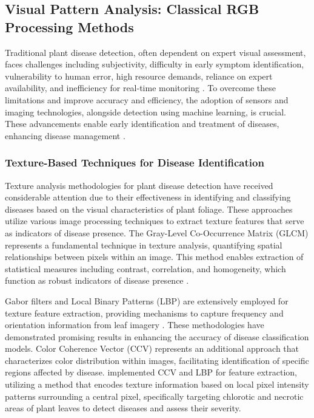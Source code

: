 \documentclass[sn-mathphys]{sn-jnl}
\theoremstyle{thmstyleone}%
\theoremstyle{thmstyletwo}%
\theoremstyle{thmstylethree}%
\begin{document}
\subsection{Visual Pattern Analysis: Classical RGB Processing Methods}
Traditional plant disease detection, often dependent on expert visual assessment, faces challenges including subjectivity, difficulty in early symptom identification, vulnerability to human error, high resource demands, reliance on expert availability, and inefficiency for real-time monitoring \citep{wang2017automatic, sankaran2010review}. To overcome these limitations and improve accuracy and efficiency, the adoption of sensors and imaging technologies, alongside detection using machine learning, is crucial. These advancements enable early identification and treatment of diseases, enhancing disease management \citep{gavhale2014overview}. 


\subsubsection{Texture-Based Techniques for Disease Identification}

Texture analysis methodologies for plant disease detection have received considerable attention due to their effectiveness in identifying and classifying diseases based on the visual characteristics of plant foliage. These approaches utilize various image processing techniques to extract texture features that serve as indicators of disease presence. The Gray-Level Co-Occurrence Matrix (GLCM) represents a fundamental technique in texture analysis, quantifying spatial relationships between pixels within an image. This method enables extraction of statistical measures including contrast, correlation, and homogeneity, which function as robust indicators of disease presence \citep{waldchen2018plant}.

Gabor filters and Local Binary Patterns (LBP) are extensively employed for texture feature extraction, providing mechanisms to capture frequency and orientation information from leaf imagery \citep{waldchen2018plant, naresh2016classification}. These methodologies have demonstrated promising results in enhancing the accuracy of disease classification models. Color Coherence Vector (CCV) represents an additional approach that characterizes color distribution within images, facilitating identification of specific regions affected by disease. \citet{abdu2020automatic} implemented CCV and LBP for feature extraction, utilizing a method that encodes texture information based on local pixel intensity patterns surrounding a central pixel, specifically targeting chlorotic and necrotic areas of plant leaves to detect diseases and assess their severity.
\end{document}
